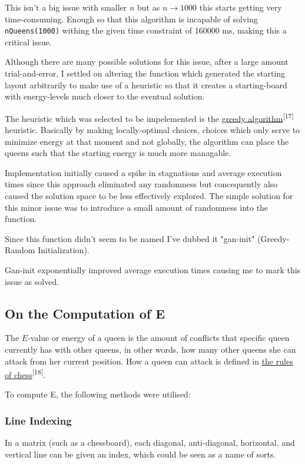 \documentclass{article}
\begin{document}
This isn't a big issue with smaller $n$ but as $n \to 1000$ this starts getting very time-consuming.
Enough so that this algorithm is incapable of solving \texttt{nQueens(1000)} withing the given time constraint of 160000 ms, making this a critical issue.

Although there are many possible solutions for this issue, after a large amount trial-and-error,
I settled on altering the function which generated the starting layout arbitrarily to make use of a heuristic so that it creates
a starting-board with energy-levels much closer to the eventual solution.

The heuristic which was selected to be impelemented is the \href{https://en.wikipedia.org/wiki/Greedy_algorithm}{greedy algorithm}\textsuperscript{[17]} heuristic.
Basically by making locally-optimal choices, choices which only serve to minimize energy at that moment and not globally,
the algorithm can place the queens such that the starting energy is much more managable.

Implementation initially caused a spike in stagnations and average execution times since this approach eliminated any randomness
but concequently also caused the solution space to be less effectively explored. The simple solution for this minor issue was to introduce a small amount of randomness
into the function.

Since this function didn't seem to be named I've dubbed it "gan-init" (Greedy-Random Initialization).

Gan-init exponentially improved average execution times causing me to mark this issue as solved.

\subsection{On the Computation of E}
The $E$-value or energy of a queen is the amount of conflicts that specific queen currently has with other queens, in other words,
how many other queens she can attack from her current position. How a queen can attack is defined in
\href{https://en.wikipedia.org/wiki/Queen_(chess)\#Placement\_and\_movement}{the rules of chess}\textsuperscript{[18]}.

To compute E, the following methods were utilised:

\clearpage
\subsubsection{Line Indexing}
In a matrix (such as a chessboard), each diagonal, anti-diagonal, horizontal, and vertical line can be given an index, which could be seen as a name of sorts.
\end{document}
